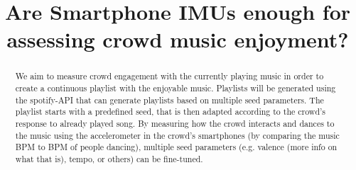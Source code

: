 \documentclass[conference]{IEEEtran}
\begin{document}
\title{ Are Smartphone IMUs enough for assessing crowd music enjoyment?}

\author{
		\and
		\and
		\and
		\and
}

\maketitle


\begin{abstract}
We aim to measure crowd engagement with the currently playing music in
order to create a continuous playlist with the enjoyable music. Playlists will be
generated using the spotify-API that can generate playlists based on multiple
seed parameters. The playlist starts with a predefined seed, that is then
adapted according to the crowd's response to already played song.
By measuring how the crowd interacts and dances to the music using the
accelerometer in the crowd's smartphones (by comparing the music BPM to
BPM of people dancing), multiple seed parameters (e.g. valence (more info on
what that is), tempo, or others) can be fine-tuned.
\end{abstract}
	
	\IEEEpeerreviewmaketitle

	
	
\end{document}
